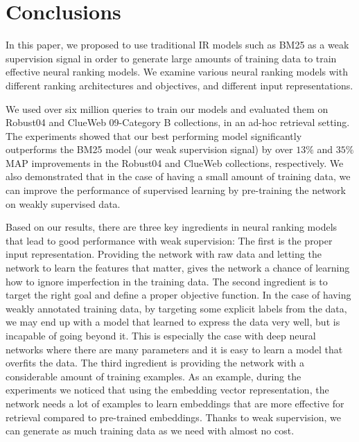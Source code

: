 \documentclass[sigconf]{acmart}
\newcommand{\feedthree}{embedding vector representation\xspace}
\newcommand{\shrink}{\vspace{-1.5ex}}
\begin{document}
\shrink
\section{Conclusions}
In this paper, we proposed to use traditional IR models such as BM25 as a weak supervision signal in order to generate large amounts of training data to train effective neural ranking models.  
We examine various neural ranking models with different ranking architectures and objectives, and different input representations. 

We used over six million queries to train our models and evaluated them on Robust04 and ClueWeb 09-Category B collections, in an ad-hoc retrieval setting. 
The experiments showed that our best performing model significantly outperforms the BM25 model (our weak supervision signal) by over $13\%$ and $35\%$ MAP improvements in the Robust04 and ClueWeb collections, respectively. 
We also demonstrated that in the case of having a small amount of training data, we can improve the performance of supervised learning by pre-training the network on weakly supervised data.

Based on our results, there are three key ingredients in neural ranking models that lead to good performance with weak supervision:
%
The first is the proper input representation. Providing the network with raw data and letting the network to learn the features that matter, gives the network a chance of learning how to ignore imperfection in the training data.
%
The second ingredient is to target the right goal and define a proper objective function. In the case of having weakly annotated training data, by targeting some explicit labels from the data, we may end up with a model that learned to express the data very well, but is incapable of going beyond it. 
This is especially the case with deep neural networks where there are many parameters and it is easy to learn a model that overfits the data.
%
The third ingredient is providing the network with a considerable amount of training examples. 
As an example, during the experiments we noticed that using the \feedthree, the network needs a lot of examples to learn embeddings that are more effective for retrieval compared to pre-trained embeddings. 
Thanks to weak supervision, we can generate as much training data as we need with almost no cost.

\end{document}
